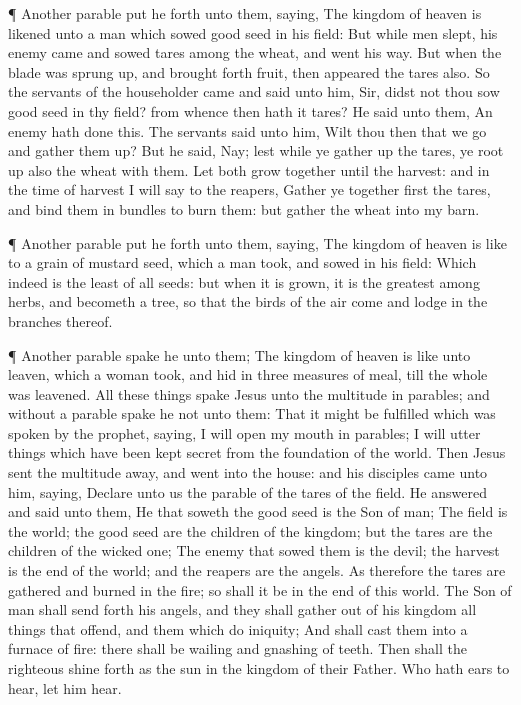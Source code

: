  ¶ Another parable put he forth unto them, saying, The
kingdom of heaven is likened unto a man which sowed good seed in his
field:  But while men slept, his enemy came and sowed tares
among the wheat, and went his way.  But when the blade was
sprung up, and brought forth fruit, then appeared the tares also.
 So the servants of the householder came and said unto him,
Sir, didst not thou sow good seed in thy field? from whence then hath it
tares?  He said unto them, An enemy hath done this. The
servants said unto him, Wilt thou then that we go and gather them up?
 But he said, Nay; lest while ye gather up the tares, ye
root up also the wheat with them.  Let both grow together
until the harvest: and in the time of harvest I will say to the reapers,
Gather ye together first the tares, and bind them in bundles to burn
them: but gather the wheat into my barn.

 ¶ Another parable put he forth unto them, saying, The
kingdom of heaven is like to a grain of mustard seed, which a man took,
and sowed in his field:  Which indeed is the least of all
seeds: but when it is grown, it is the greatest among herbs, and
becometh a tree, so that the birds of the air come and lodge in the
branches thereof.

 ¶ Another parable spake he unto them; The kingdom of
heaven is like unto leaven, which a woman took, and hid in three
measures of meal, till the whole was leavened.  All these
things spake Jesus unto the multitude in parables; and without a parable
spake he not unto them:  That it might be fulfilled which
was spoken by the prophet, saying, I will open my mouth in parables; I
will utter things which have been kept secret from the foundation of the
world.  Then Jesus sent the multitude away, and went into
the house: and his disciples came unto him, saying, Declare unto us the
parable of the tares of the field.  He answered and said
unto them, He that soweth the good seed is the Son of man; 
The field is the world; the good seed are the children of the kingdom;
but the tares are the children of the wicked one;  The
enemy that sowed them is the devil; the harvest is the end of the world;
and the reapers are the angels.  As therefore the tares are
gathered and burned in the fire; so shall it be in the end of this
world.  The Son of man shall send forth his angels, and
they shall gather out of his kingdom all things that offend, and them
which do iniquity;  And shall cast them into a furnace of
fire: there shall be wailing and gnashing of teeth.  Then
shall the righteous shine forth as the sun in the kingdom of their
Father. Who hath ears to hear, let him hear.

